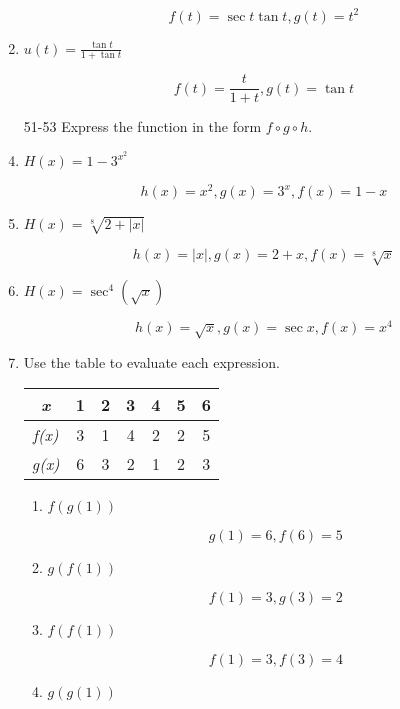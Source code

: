 \documentclass{article}
\begin{document}
\begin{enumerate}
				$$f(t) = \sec t \tan t, g(t) = t^2$$
				
			\item $u(t) = \frac{\tan t}{1  + \tan t}$
			
				$$f(t) = \frac{t}{1 + t}, g(t) = \tan t$$

			\item[51-53] Express the function in the form $f \circ g \circ h$.
			
				\item $H(x) = 1 - 3^{x^{2}}$
				
					$$h(x)= x^2, g(x) = 3^{x}, f(x) = 1 - x$$
					
				\item $H(x) = \sqrt[8]{2 + |x|}$
				
					$$h(x) = |x|, g(x) = 2 + x, f(x) = \sqrt[8]{x}$$
					
				\item $H(x) = \sec^{4}(\sqrt{x})$
				
					$$h(x) = \sqrt{x}, g(x) = \sec x, f(x) = x^4$$
					
				\item Use the table to evaluate each expression.
				
				\begin{tabular}{|c|c|c|c|c|c|c|}
					
					\hline
					\emph{x} & 1 & 2 & 3 & 4 & 5 & 6 \\
					\hline
					\emph{f(x)}&  3 & 1 & 4 & 2 & 2 & 5 \\
					\hline
					\emph{g(x)} & 6 & 3 & 2 & 1 & 2  & 3 \\
					\hline
					
				
					
				\end{tabular}
				
				\begin{enumerate}
				
					\item $f(g(1))$
						
						$$g(1) = 6, f(6) = 5$$
						
					\item $g(f(1))$
					
						$$f(1) = 3, g(3) =2$$
						
					\item $f(f(1))$
					
						$$f(1) = 3, f(3) = 4$$
						
					\item $g(g(1))$
					

\end{enumerate}
\end{enumerate}
\end{document}
